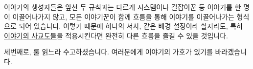 \documentclass{report}
\begin{document}
	이야기의 생성자들은 앞선 두 규칙과는 다르게 시스템이나 길잡이꾼 등 이야기를 한 명이 이끌어나가지 않고, 모든 이야기꾼이 함께 흐름을 통해 이야기를 이끌어나가는 형식으로 되어 있습니다. 이렇기 때문에 하나의 서사, 같은 배경 설정이라 할지라도, 특히 \hyperlink{nogm-socialite}{이야기의 사교도들}을 적용시킨다면 완전히 다른 흐름을 즐길 수 있을 것입니다.
	
	세번째로, 룰 읽느라 수고하셨습니다. 여러분에게 이야기의 가호가 있기를 바라겠습니다.
\end{document}
